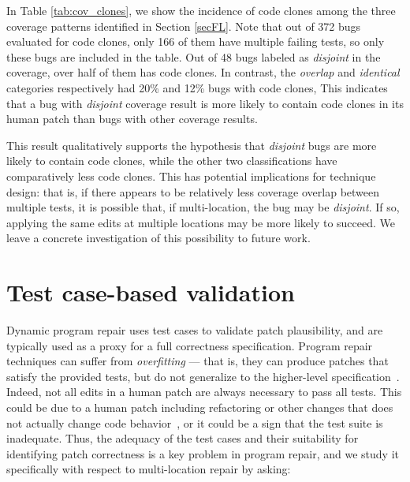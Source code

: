 \documentclass[sigconf, timestamp-false, anonymous=true]{acmart}
\begin{document}
In Table \ref{tab:cov_clones}, we show the incidence of code clones among the three 
coverage patterns identified in Section \ref{secFL}. Note that out of 372 bugs evaluated for code clones, only 166 of them have multiple failing tests, so only these bugs are included in the table.  Out of 48 bugs labeled as 
\emph{disjoint} in the coverage, over half of them has code clones. In contrast, the 
\emph{overlap} and \emph{identical} categories respectively had 20\% and 12\% bugs with code clones, 
This indicates that a 
bug with \emph{disjoint} coverage result is more likely to contain code clones in its
human patch than bugs with other coverage results. 

This result qualitatively supports the hypothesis that \emph{disjoint} bugs are more likely to contain 
code clones, while the other two classifications have comparatively less code
clones. This has potential implications for technique design: that is, if there
appears to be relatively less coverage overlap between multiple tests, it is
possible that, if multi-location, the bug may be \emph{disjoint}.  If so,
applying the same edits at multiple locations may be more likely to succeed.  We
leave a concrete investigation of this possibility to future work.



\section{Test case-based validation}
\label{sec:tests}

Dynamic program repair uses test cases to validate patch plausibility, and are
typically used as a proxy for a full correctness specification.  Program repair
techniques can suffer from \emph{overfitting} --- that is, they can produce
patches that satisfy the provided tests, but do not generalize to the
higher-level specification~\cite{Smith15fse}.  
%
Indeed, not all edits in a human patch are always necessary to pass all tests. This could be
due to a human patch including refactoring or other changes that does not actually
change code behavior~\cite{api-refactoring, tangledchanges}, or it could be a sign that the test
suite is inadequate.  
Thus, the adequacy of the test
cases and their suitability for identifying patch correctness is a key problem
in program repair, and we study it specifically with respect to multi-location
repair by asking:

\end{document}
